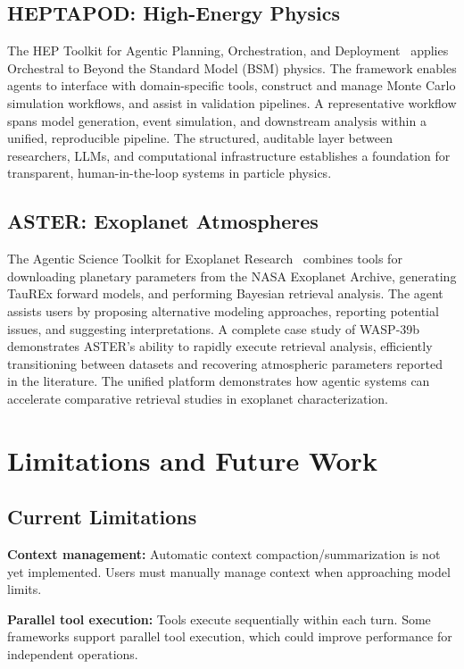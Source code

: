 \documentclass{article}
\begin{document}
\subsection{HEPTAPOD: High-Energy Physics}

The HEP Toolkit for Agentic Planning, Orchestration, and Deployment~\cite{HEPTAPOD} applies Orchestral to Beyond the Standard Model (BSM) physics. The framework enables agents to interface with domain-specific tools, construct and manage Monte Carlo simulation workflows, and assist in validation pipelines. A representative workflow spans model generation, event simulation, and downstream analysis within a unified, reproducible pipeline. The structured, auditable layer between researchers, LLMs, and computational infrastructure establishes a foundation for transparent, human-in-the-loop systems in particle physics.

\subsection{ASTER: Exoplanet Atmospheres}

The Agentic Science Toolkit for Exoplanet Research~\cite{ASTER} combines tools for downloading planetary parameters from the NASA Exoplanet Archive, generating TauREx forward models, and performing Bayesian retrieval analysis. The agent assists users by proposing alternative modeling approaches, reporting potential issues, and suggesting interpretations. A complete case study of WASP-39b demonstrates ASTER's ability to rapidly execute retrieval analysis, efficiently transitioning between datasets and recovering atmospheric parameters reported in the literature. The unified platform demonstrates how agentic systems can accelerate comparative retrieval studies in exoplanet characterization.

\section{Limitations and Future Work}

\subsection{Current Limitations}

\textbf{Context management:} Automatic context compaction/summarization is not yet implemented. Users must manually manage context when approaching model limits.

\textbf{Parallel tool execution:} Tools execute sequentially within each turn. Some frameworks support parallel tool execution, which could improve performance for independent operations.
\end{document}

